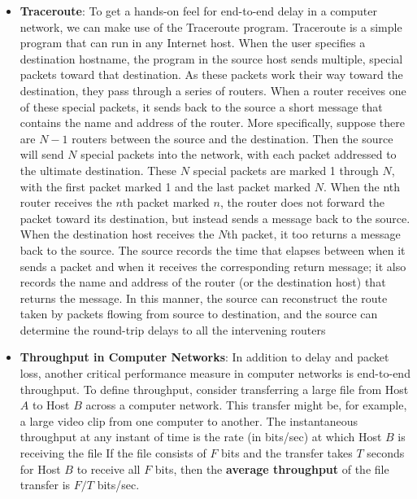 \documentclass{report}
\begin{document}
\begin{itemize}
        \item \textbf{Traceroute}: To get a hands-on feel for end-to-end delay in a computer network, we can make use of the Traceroute program. Traceroute is a simple program that can run in any Internet host. When the user specifies a destination hostname, the program in the source host sends multiple, special packets toward that destination. As these packets work their way toward the destination, they pass through a series of routers. When a router receives one of these special packets, it sends back to the source a short message that contains the name and address of the router.
            \bigbreak \noindent 
            More specifically, suppose there are $N - 1$ routers between the source and the destination. Then the source will send $N$ special packets into the network, with each packet addressed to the ultimate destination. These $N$ special packets are marked 1 through $N$, with the first packet marked 1 and the last packet marked $N$. When the nth router receives the $n$th packet marked $n$, the router does not forward the packet toward its destination, but instead sends a message back to the source. When the destination host receives the $N$th packet, it too returns a message back to the source. The source records the time that elapses between when it sends a packet and when it receives the corresponding return message; it also records the name and address of the router (or the destination host) that returns the message. In this manner, the source can reconstruct the route taken by packets flowing from source to destination, and the source can determine the round-trip delays to all the intervening routers
        \item \textbf{Throughput in Computer Networks}: In addition to delay and packet loss, another critical performance measure in computer networks is end-to-end throughput. To define throughput, consider transferring a large file from Host $A$ to Host $B$ across a computer network. This transfer might be, for example, a large video clip from one computer to another. The instantaneous throughput at any instant of time is the rate (in bits/sec) at which Host $B$ is receiving the file
            \bigbreak \noindent 
            If the file consists of $F$ bits and the transfer takes $T$ seconds for Host $B$ to receive all $F$ bits, then the \textbf{average throughput} of the file transfer is $F/T$ bits/sec.
            \bigbreak \noindent 

\end{itemize}
\end{document}
